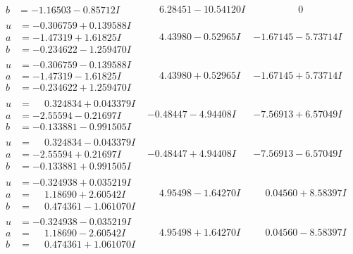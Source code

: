 \documentclass[1p]{elsarticle_modified}
\theoremstyle{definition}
\begin{document}
$$\begin{array}{c|c|c}
\begin{aligned}
b &= -1.16503 - 0.85712 I\end{aligned}
 & \phantom{-}6.28451 - 10.54120 I & \phantom{-0.000000 } 0 \\ \hline\begin{aligned}
u &= -0.306759 + 0.139588 I \\
a &= -1.47319 + 1.61825 I \\
b &= -0.234622 - 1.259470 I\end{aligned}
 & \phantom{-}4.43980 - 0.52965 I & -1.67145 - 5.73714 I \\ \hline\begin{aligned}
u &= -0.306759 - 0.139588 I \\
a &= -1.47319 - 1.61825 I \\
b &= -0.234622 + 1.259470 I\end{aligned}
 & \phantom{-}4.43980 + 0.52965 I & -1.67145 + 5.73714 I \\ \hline\begin{aligned}
u &= \phantom{-}0.324834 + 0.043379 I \\
a &= -2.55594 - 0.21697 I \\
b &= -0.133881 - 0.991505 I\end{aligned}
 & -0.48447 - 4.94408 I & -7.56913 + 6.57049 I \\ \hline\begin{aligned}
u &= \phantom{-}0.324834 - 0.043379 I \\
a &= -2.55594 + 0.21697 I \\
b &= -0.133881 + 0.991505 I\end{aligned}
 & -0.48447 + 4.94408 I & -7.56913 - 6.57049 I \\ \hline\begin{aligned}
u &= -0.324938 + 0.035219 I \\
a &= \phantom{-}1.18690 + 2.60542 I \\
b &= \phantom{-}0.474361 - 1.061070 I\end{aligned}
 & \phantom{-}4.95498 - 1.64270 I & \phantom{-}0.04560 + 8.58397 I \\ \hline\begin{aligned}
u &= -0.324938 - 0.035219 I \\
a &= \phantom{-}1.18690 - 2.60542 I \\
b &= \phantom{-}0.474361 + 1.061070 I\end{aligned}
 & \phantom{-}4.95498 + 1.64270 I & \phantom{-}0.04560 - 8.58397 I \\ \hline\begin{aligned}

\end{aligned}
\end{array}$$
\end{document}
